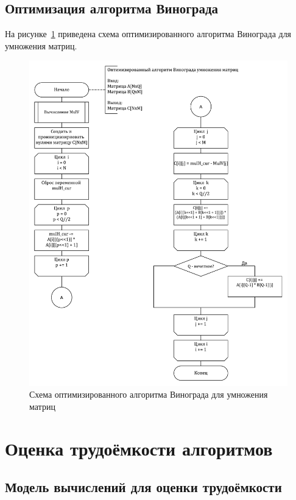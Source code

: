 \subsection{Оптимизация алгоритма Винограда}

На рисунке~\ref{img:WinMultOpt} приведена схема оптимизированного алгоритма Винограда для умножения матриц.

\begin{figure}[H]
	\centering
	\includegraphics[height=0.8\textheight]{images/WinMultOpt.pdf}
	\caption{Схема оптимизированного алгоритма Винограда для умножения матриц}
	\label{img:WinMultOpt}
\end{figure}
\clearpage

\section{Оценка трудоёмкости алгоритмов}

\subsection{Модель вычислений для оценки трудоёмкости}

